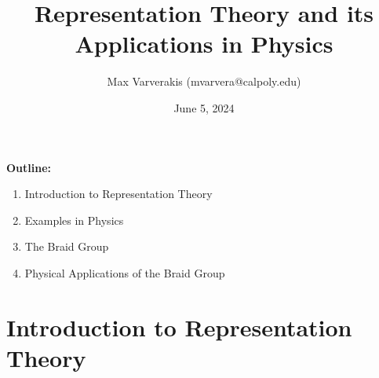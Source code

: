 \documentclass[compress,aspectratio=169,10pt,usenames,dvipsnames]{beamer}
\title[Defense]{Representation Theory and its Applications in Physics \\ \;}
\author[Max Varverakis (mvarvera@calpoly.edu)]{Max Varverakis (mvarvera@calpoly.edu)}
\institute[Cal Poly]{}%
\date{June 5, 2024}
\begin{document}
\begin{frame}
\titlepage

\end{frame}


\begin{frame}
\textbf{Outline:}
\begin{enumerate}
	\item Introduction to Representation Theory
	\item Examples in Physics
	\item The Braid Group
	\item Physical Applications of the Braid Group
\end{enumerate}
\end{frame}






\section{Introduction to Representation Theory}
\begin{frame}
  \sectionpage
\end{frame}

\end{document}
